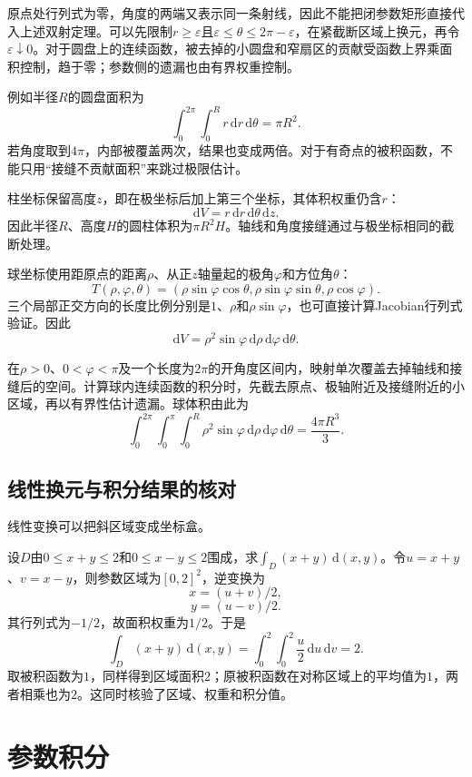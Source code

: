 原点处行列式为零，角度的两端又表示同一条射线，因此不能把闭参数矩形直接代入上述双射定理。可以先限制$r\geq\varepsilon$且$\varepsilon\leq\theta\leq2\pi-\varepsilon$，在紧截断区域上换元，再令$\varepsilon\downarrow0$。对于圆盘上的连续函数，被去掉的小圆盘和窄扇区的贡献受函数上界乘面积控制，趋于零；参数侧的遗漏也由有界权重控制。

例如半径$R$的圆盘面积为
\[
 \int_0^{2\pi}\int_0^R r\,\mathrm dr\,\mathrm d\theta=\pi R^2.
\]
若角度取到$4\pi$，内部被覆盖两次，结果也变成两倍。对于有奇点的被积函数，不能只用“接缝不贡献面积”来跳过极限估计。

柱坐标保留高度$z$，即在极坐标后加上第三个坐标，其体积权重仍含$r$：
\[
 \mathrm dV=r\,\mathrm dr\,\mathrm d\theta\,\mathrm dz.
\]
因此半径$R$、高度$H$的圆柱体积为$\pi R^2H$。轴线和角度接缝通过与极坐标相同的截断处理。

球坐标使用距原点的距离$\rho$、从正$z$轴量起的极角$\varphi$和方位角$\theta$：
\[
 T(\rho,\varphi,\theta)
 =(\rho\sin\varphi\cos\theta,\rho\sin\varphi\sin\theta,\rho\cos\varphi).
\]
三个局部正交方向的长度比例分别是$1$、$\rho$和$\rho\sin\varphi$，也可直接计算Jacobian行列式验证。因此
\[
 \mathrm dV=\rho^2\sin\varphi\,\mathrm d\rho\,\mathrm d\varphi\,\mathrm d\theta.
\]

在$\rho>0$、$0<\varphi<\pi$及一个长度为$2\pi$的开角度区间内，映射单次覆盖去掉轴线和接缝后的空间。计算球内连续函数的积分时，先截去原点、极轴附近及接缝附近的小区域，再以有界性估计遗漏。球体积由此为
\[
 \int_0^{2\pi}\int_0^\pi\int_0^R
 \rho^2\sin\varphi\,\mathrm d\rho\,\mathrm d\varphi\,\mathrm d\theta
 =\frac{4\pi R^3}{3}.
\]

\subsection{线性换元与积分结果的核对}

线性变换可以把斜区域变成坐标盒。

设$D$由$0\leq x+y\leq2$和$0\leq x-y\leq2$围成，求$\int_D(x+y)\,\mathrm d(x,y)$。令$u=x+y$、$v=x-y$，则参数区域为$[0,2]^2$，逆变换为
\[
 x=(u+v)/2,
\]
\[
 y=(u-v)/2.
\]
其行列式为$-1/2$，故面积权重为$1/2$。于是
\[
 \int_D(x+y)\,\mathrm d(x,y)
 =\int_0^2\int_0^2\frac u2\,\mathrm du\,\mathrm dv=2.
\]
取被积函数为$1$，同样得到区域面积$2$；原被积函数在对称区域上的平均值为$1$，两者相乘也为$2$。这同时核验了区域、权重和积分值。

\section{参数积分}

